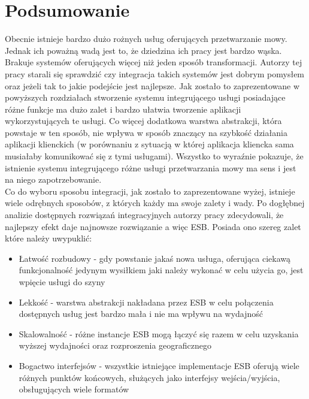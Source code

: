 
\chapter{Podsumowanie} %



\ifpdf
    \graphicspath{{7/figures/PNG/}{7/figures/PDF/}{7/figures/}}
\else
    \graphicspath{{7/figures/EPS/}{7/figures/}}
\fi

Obecnie istnieje bardzo dużo rożnych usług oferujących przetwarzanie mowy. Jednak ich poważną wadą jest to, że dziedzina ich pracy jest bardzo wąska. Brakuje systemów oferujących więcej niż jeden sposób transformacji. Autorzy tej pracy starali się sprawdzić czy integracja takich systemów jest dobrym pomysłem oraz jeżeli tak to jakie podejście jest najlepsze. Jak zostało to zaprezentowane w powyższych rozdziałach stworzenie systemu integrującego usługi posiadające różne funkcje ma dużo zalet i bardzo ułatwia tworzenie aplikacji wykorzystujących te usługi. Co więcej dodatkowa warstwa abstrakcji, która powstaje w ten sposób, nie wpływa w sposób znaczący na szybkość działania aplikacji klienckich (w porównaniu z sytuacją w której aplikacja kliencka sama musiałaby komunikować się z tymi usługami). Wszystko to wyraźnie pokazuje, że istnienie systemu integrującego różne usługi przetwarzania mowy ma sens i jest na niego zapotrzebowanie. \\
Co do wyboru sposobu integracji, jak zostało to zaprezentowane wyżej, istnieje wiele odrębnych sposobów, z których każdy ma swoje zalety i wady. Po dogłębnej analizie dostępnych rozwiązań integracyjnych autorzy pracy zdecydowali, że najlepszy efekt daje najnowsze rozwiązanie a więc ESB. Posiada ono szereg zalet które należy uwypuklić:
\begin{itemize}
	\item Łatwość rozbudowy - gdy powstanie jakaś nowa usługa, oferująca ciekawą funkcjonalność jedynym wysiłkiem jaki należy wykonać w celu użycia go, jest wpięcie usługi do szyny
	\item Lekkość - warstwa abstrakcji nakładana przez ESB w celu połączenia dostępnych usług jest bardzo mała i nie ma wpływu na wydajność
	\item Skalowalność - różne instancje ESB mogą łączyć się razem w celu uzyskania wyższej wydajności oraz rozproszenia geograficznego
	\item Bogactwo interfejsów - wszystkie istniejące implementacje ESB oferują wiele różnych punktów końcowych, służących jako interfejsy wejścia/wyjścia, obsługujących wiele formatów
\end{itemize}
